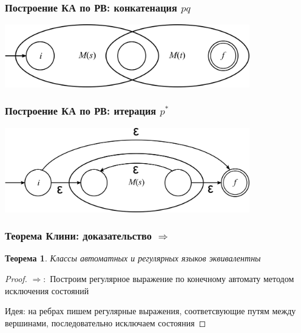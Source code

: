 \documentclass{beamer}
\newtheorem{rutheorem}{Теорема}
\begin{document}
\begin{frame}
  \transwipe[direction=90]
  \frametitle{Построение КА по РВ: конкатенация $p q$}
    \begin{center}
      \includegraphics[width=0.80\textwidth]{pics/concat.png}  
    \end{center}
\end{frame}

\begin{frame}
  \transwipe[direction=90]
  \frametitle{Построение КА по РВ: итерация $p^*$}
    \begin{center}
      \includegraphics[width=0.80\textwidth]{pics/star.png}  
    \end{center}
\end{frame}

\begin{frame}
  \transwipe[direction=90]
  \frametitle{Теорема Клини: доказательство $\Rightarrow$}
  
  \begin{rutheorem}
   Классы автоматных и регулярных языков \emph{эквивалентны}
  \end{rutheorem}
  
  \begin{proof} 
   $\Rightarrow: $
    Построим регулярное выражение по конечному автомату методом исключения состояний
    
    Идея: на ребрах пишем регулярные выражения, соответсвующие путям между вершинами, последовательно исключаем состояния   
    
  \end{proof}
\end{frame}
\end{document}
